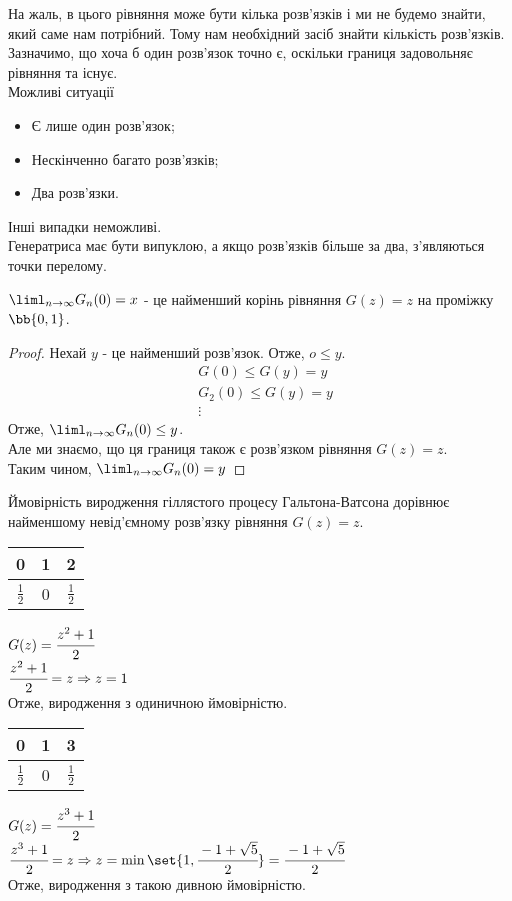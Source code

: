 На жаль, в цього рівняння може бути кілька розв’язків і ми не будемо знайти, який саме нам потрібний. Тому нам необхідний засіб знайти кількість розв’язків. Зазначимо, що хоча б один розв’язок точно є, оскільки границя %
задовольняє рівняння та існує.\\
Можливі ситуації
\begin{itemize}
\item Є лише один розв’язок;
\item Нескінченно багато розв’язків;
\item Два розв’язки.
\end{itemize}
Інші випадки неможливі.\\
Генератриса має бути випуклою, а якщо розв’язків більше за два, з’являються точки перелому.\\
\begin{tver}
$\liml_{n\to\infty}G_n(0)=x$ - це найменший корінь рівняння $G(z)=z$ на проміжку $\bb{0,1}$.
\end{tver}
\begin{proof}
Нехай $y$ - це найменший розв’язок. Отже, $o\leq y$.\\
\begin{eqnarray*}
&G(0)\leq G(y)=y\\
&G_2(0)\leq G(y) = y\\
&\vdots
\end{eqnarray*}
Отже, $\liml_{n\to\infty} G_n(0)\leq y$.\\
Але ми знаємо, що ця границя також є розв’язком рівняння $G(z)=z$. \\
Таким чином, $\liml_{n\to\infty} G_n(0)=y$
\end{proof}
\begin{teor}
Ймовірність виродження гіллястого процесу Гальтона-Ватсона дорівнює найменшому невід’ємному розв’язку рівняння $G(z)=z$.
\end{teor}
\begin{exs}
\begin{tabular}{c|c|c}
0 & 1 & 2\\
\hline
$\frac12$ & 0 & $\frac12$
\end{tabular}
$G(z) = \cfrac{z^2+1}2$\\
$\cfrac{z^2+1}2 = z \Rightarrow z =1$\\
Отже, виродження з одиничною ймовірністю.
\end{exs}
\begin{exs}
\begin{tabular}{c|c|c}
0 & 1 & 3\\
\hline
$\frac12$ & 0 & $\frac12$
\end{tabular}
$G(z) = \cfrac{z^3+1}2$\\
$\cfrac{z^3+1}2 = z \Rightarrow z =\min\set{1,\cfrac{-1+\sqrt5}2} = \cfrac{-1+\sqrt5}2$\\
Отже, виродження з такою дивною ймовірністю.
\end{exs}